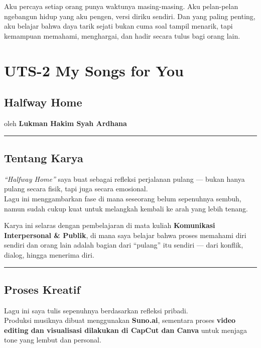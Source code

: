 \documentclass[
  letterpaper,
  DIV=11,
  numbers=noendperiod]{scrreprt}
\begin{document}
Aku percaya setiap orang punya waktunya masing-masing. Aku pelan-pelan
ngebangun hidup yang aku pengen, versi diriku sendiri. Dan yang paling
penting, aku belajar bahwa daya tarik sejati bukan cuma soal tampil
menarik, tapi kemampuan memahami, menghargai, dan hadir secara tulus
bagi orang lain.


\chapter{UTS-2 My Songs for You}\label{uts-2-my-songs-for-you}

\section{Halfway Home 🎵}\label{halfway-home}

oleh \textbf{Lukman Hakim Syah Ardhana}

\begin{center}\rule{0.5\linewidth}{0.5pt}\end{center}

\section{Tentang Karya}\label{tentang-karya}

\emph{``Halfway Home''} saya buat sebagai refleksi perjalanan pulang ---
bukan hanya pulang secara fisik, tapi juga secara emosional.\\
Lagu ini menggambarkan fase di mana seseorang belum sepenuhnya sembuh,
namun sudah cukup kuat untuk melangkah kembali ke arah yang lebih
tenang.

Karya ini selaras dengan pembelajaran di mata kuliah \textbf{Komunikasi
Interpersonal \& Publik}, di mana saya belajar bahwa proses memahami
diri sendiri dan orang lain adalah bagian dari ``pulang'' itu sendiri
--- dari konflik, dialog, hingga menerima diri.

\begin{center}\rule{0.5\linewidth}{0.5pt}\end{center}

\section{Proses Kreatif}\label{proses-kreatif}

Lagu ini saya tulis sepenuhnya berdasarkan refleksi pribadi.\\
Produksi musiknya dibuat menggunakan \textbf{Suno.ai}, sementara proses
\textbf{video editing dan visualisasi dilakukan di CapCut dan Canva}
untuk menjaga tone yang lembut dan personal.
\end{document}
